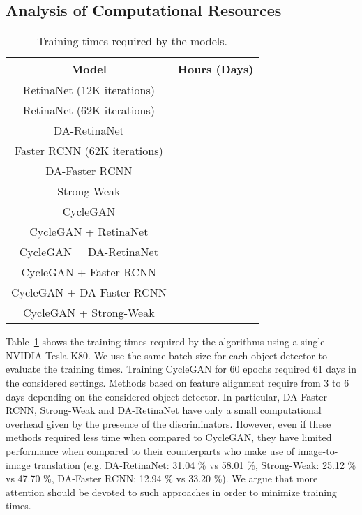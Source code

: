 \documentclass[preprint]{elsarticle}
\begin{document}
\subsection{Analysis of Computational Resources}
\label{computational_re}
\begin{table}[t!]
\caption{Training times required by the models.}
\label{time}
\centering
\begin{tabular}{|c||c|}
\hline
Model & Hours (Days) \\
\hline
RetinaNet (12K iterations) & \\
\hline
RetinaNet (62K iterations) & \\
\hline
DA-RetinaNet & \\
\hline
Faster RCNN (62K iterations) &  \\
\hline
DA-Faster RCNN & \\
\hline
Strong-Weak & \\
\hline
CycleGAN &  \\
\hline
CycleGAN + RetinaNet &  \\
\hline
CycleGAN + DA-RetinaNet &  \\
\hline
CycleGAN + Faster RCNN &  \\
\hline
CycleGAN + DA-Faster RCNN &  \\
\hline
CycleGAN + Strong-Weak &  \\
\hline
\end{tabular}
\end{table}
Table~\ref{time} shows the training times required by the algorithms using a single NVIDIA Tesla K80. We use the same batch size for each object detector to evaluate the training times. Training CycleGAN for 60 epochs required 61 days in the considered settings. Methods based on feature alignment require from 3 to 6 days depending on the considered object detector. In particular, DA-Faster RCNN, Strong-Weak and DA-RetinaNet have only a small computational overhead given by the presence of the discriminators. However, even if these methods required less time when compared to CycleGAN, they have limited performance when compared to their counterparts who make use of image-to-image translation (e.g. DA-RetinaNet: 31.04 \% vs 58.01 \%, Strong-Weak: 25.12 \% vs 47.70 \%, DA-Faster RCNN: 12.94 \% vs 33.20 \%). We argue that more attention should be devoted to such approaches in order to minimize training times.
\end{document}
